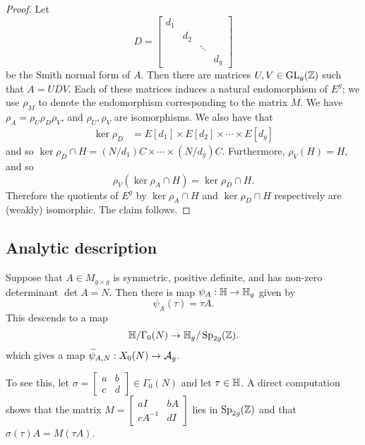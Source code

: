 \documentclass{amsart}
\begin{document}
\begin{proof}
  Let
   \[
     D =
    \begin{bmatrix}
      {d_1} & & & \\
      & {d_2} & & \\
      & & \ddots & \\
      & & & {d_{g}}
    \end{bmatrix}
  \]
  be the Smith normal form of $A$. Then there are matrices $U,V \in \operatorname{GL}_g(\mathbb{Z})$ such that $A = UDV$. Each of these matrices induces a natural endomorphism of $E^g$; we use $\rho_M$ to denote the endomorphism corresponding to the matrix $M$. We have $\rho_A = \rho_U \rho_D \rho_V$, and $\rho_U, \rho_V$ are isomorphisms. We also have that
  \begin{align*}
    \ker \rho_D &= E[d_1] \times E[d_2] \times \cdots \times E[d_g]
  \end{align*}
  and so $\ker \rho_D \cap H = (N/d_1)C \times \cdots \times (N/d_g)C$. Furthermore, $\rho_V(H) = H$, and so
  \[
    \rho_V(\ker \rho_A \cap H) = \ker \rho_D \cap H.
  \]
  Therefore the quotients of $E^g$ by $\ker \rho_A \cap H$ and $\ker \rho_D \cap H$ respectively are (weakly) isomorphic. The claim follows.
\end{proof}

\subsection{Analytic description}
\label{sec:ana-desc}

Suppose that $A \in M_{g \times g}$ is symmetric, positive definite, and has non-zero determinant $\det A = N$. Then there is map $\psi_A: \mathbb{H} \to \mathbb{H}_g$ given by
\[
  \psi_A(\tau) = \tau A.
\]
This descends to a map
\begin{equation}\label{def:psi-A-n}
  \mathbb{H}/\Gamma_0(N) \to \mathbb{H}_g/\operatorname{Sp}_{2g}(\mathbb{Z}).
\end{equation}
which gives a map $\widetilde{\psi}_{A,N}: X_0(N) \to \mathcal{A}_g$.

To see this, let $\sigma = \begin{bmatrix} a & b \\ c & d \end{bmatrix} \in \Gamma_0(N)$ and let $\tau \in \mathbb{H}$. A direct computation shows that the matrix $M = \begin{bmatrix} aI & bA \\ cA^{-1} & dI \end{bmatrix}$ lies in $\operatorname{Sp}_{2g}(\mathbb{Z})$
and that $\sigma(\tau)A = M(\tau A)$.
\end{document}
